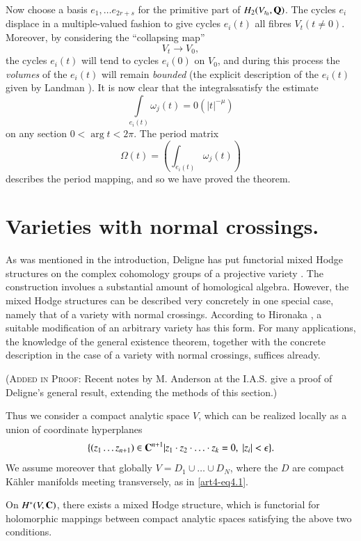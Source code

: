 Now choose a basis $e_1, \ldots e_{2r+s}$ for the primitive part of $H_2 (V_{t_0}, \mathbf{Q})$. The cycles $e_i$ displace in a multiple-valued fashion to give cycles $e_i(t)$ all fibres $V_t (t \neq 0)$. Moreover, by considering the ``collapsing map''
$$
V_t \to V_0,
$$
the cycles $e_i (t)$ will tend to cycles $e_i (0)$ on $V_0$, and during this process the \textit{volumes} of the $e_i(t)$ will remain \textit{bounded} (\cf the explicit description of the $e_i(t)$ given by Landman \cite{art4-key35}). It is now clear that the integrals\pageoriginale satisfy the estimate
$$
\int\limits_{e_i (t)} \omega_j (t) = 0 (|t|^{-\mu})
$$
on any section $0 < \arg t < 2\pi$. The period matrix
$$
\Omega (t) = \left(\int_{e_i (t)} \omega_j (t) \right)
$$
describes the period mapping, and so we have proved the theorem.

\section{Varieties with normal crossings.}\label{art4-sec4}
As was mentioned in the introduction, Deligne has put functorial mixed Hodge structures on the complex cohomology groups of a projective variety \cite{art4-key14}. The construction involues a substantial amount of homological algebra. However, the mixed Hodge structures can be described very concretely in one special case, namely that of a variety with normal crossings. According to Hironaka \cite{art4-key29}, a suitable modification of an arbitrary variety has this form. For many applications, the knowledge of the general existence theorem, together with the concrete description in the case of a variety with normal crossings, suffices already.

(\textsc{Added in Proof}: Recent notes by M. Anderson at the I.A.S. give a proof of Deligne's general result, extending the methods of this section.)

Thus we consider a compact analytic space  $V$, which can be realized locally as a union of coordinate hyperplanes
\setcounter{equation}{0}
\begin{equation}
\{(z_1 \ldots z_{n+1}) \in \mathbf{C}^{n+1} | z_1 \cdot z_2 \cdot \ldots \cdot z_k = 0,  \; |z_i| < \epsilon \}. 
\label{art4-eq4.1}
\end{equation}
We assume moreover that globally $V = D_1 \cup \ldots \cup D_N$, where the $D$ are compact K\"ahler manifolds meeting transversely, as in \eqref{art4-eq4.1}.

\setcounter{proposition}{1}
\begin{proposition}\label{art4-prop4.2}
On $H^\ast (V, \mathbf{C})$, there exists a mixed Hodge structure, which is functorial for holomorphic mappings between compact analytic spaces satisfying the above two conditions.
\end{proposition}


